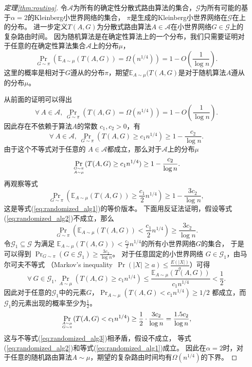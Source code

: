 \begin{proof}[定理\ref{thm:routing}]
令$\mathcal{A}$为所有的确定性分散式路由算法的集合，$\mathcal{G}$为所有可能的基于$\alpha = 2$的Kleinberg小世界网络的集合，
$\pi$是生成的Kleinberg小世界网络在$\mathcal{G}$在上的分布。
进一步定义$T(A,G)$为分散式路由算法$A\in \mathcal{A}$在小世界网络$G\in \mathcal{G}$上的复杂路由时间。
因为随机算法是在确定性算法上的一个分布，我们只需要证明对于任意的在确定性算法集合$\mathcal{A}$上的分布$\mu$，
\begin{equation}\label{eq:randomized_alg1}
\Pr_{G\sim \pi}(\mathbb{E}_{A\sim \mu}(T(A,G))=\Omega(n^{1/4}))=1-O(\frac{1}{\log{n}}).
\end{equation} 
这里的概率是相对于$G$遵从的分布$\pi$，期望$\mathbb{E}_{A\sim \mu}(T(A,G)$是对于随机算法$A$遵从的分布$\mu$。

从前面的证明可以得出
$$
\forall~A\in \mathcal{A},~\Pr_{G\sim \pi}(T(A,G)=\Omega(n^{1/4}))=1-O(\frac{1}{\log{n}}).
$$
因此存在不依赖于算法$A$的常数 $c_1,c_2>0$，有 
$$
\forall~A\in \mathcal{A},~\Pr_{G\sim \pi}(T(A,G)\geq c_1n^{1/4})\geq 1-\frac{c_2}{\log{n}}. 
$$
由于这个不等式对于任意的 $A\in \mathcal{A}$都成立，那么对于$\mathcal{A}$上的分布$\mu$
\begin{equation}\label{eq:randomized_alg3}
\Pr_{G\sim \pi\atop A\sim \mu}(T(A,G)\geq c_1n^{1/4})\geq 1-\frac{c_2}{\log{n}}. 
\end{equation}
再观察等式
\begin{equation}\label{eq:randomized_alg2}
\Pr_{G\sim \pi}(\mathbb{E}_{A\sim \mu}(T(A,G))\geq \frac{c_1}{2}n^{1/4})\geq 1-\frac{3c_2}{\log{n}},
\end{equation}
这是等式(\ref{eq:randomized_alg1})的等价版本。 
下面用反证法证明，假设等式(\ref{eq:randomized_alg2})不成立，那么
$$
\Pr_{G\sim \pi}(\mathbb{E}_{A\sim \mu}(T(A,G))< \frac{c_1}{2}n^{1/4})\geq \frac{3c_2}{\log{n}}.
$$
令$\mathcal{G}_1\subseteq \mathcal{G}$ 为满足 $\mathbb{E}_{A\sim \mu}(T(A,G))< \frac{c_1}{2}n^{1/4}$的所有小世界网络$G$的集合，
于是可以得到 $\Pr_{G\sim \pi}(G\in \mathcal{G}_1)\geq \frac{3c_2}{\log{n}}$。
对于任意固定的小世界网络 $G\in \mathcal{G}_1$，由马尔可夫不等式
（Markov's inequality~$\Pr(|X|\geq a) \leq \frac{E(|X|)}{a}$）可得
$$\forall~G\in \mathcal{G}_1,\Pr_{A\sim\mu}(T(A,G)\geq c_1n^{1/4})\leq \frac{\mathbb{E}_{A\sim\mu}(T(A,G))}{c_1n^{1/4}}<\frac{1}{2}.$$
因此对于任意的$\mathcal{G}_1$中的元素$G$，$\Pr_{A\sim\mu}(T(A,G)< c_1n^{1/4})\geq 1/2$ 都成立，而 $\mathcal{G}_1$的元素出现的概率至少为$\frac{1}{2}$。
$$\Pr_{A\sim\mu\atop G\sim \pi}(T(A,G)< c_1n^{1/4})\geq \frac{1}{2}\cdot \frac{3c_2}{\log{n}}=\frac{1.5c_2}{\log{n}},$$
这与不等式(\ref{eq:randomized_alg3})相矛盾，假设不成立，
等式(\ref{eq:randomized_alg2})和等式(\ref{eq:randomized_alg1})成立。
因此在$\alpha=2$时，对于任意的随机路由算法$A\sim \mu$，期望的复杂路由时间均有$\Omega(n^{1/4})$的下界。
\end{proof}



